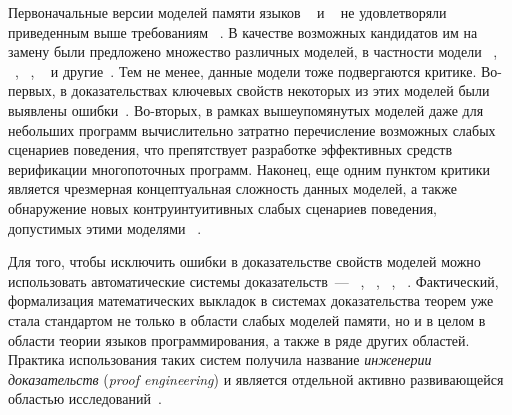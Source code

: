 Первоначальные версии моделей памяти языков
\CPP~\autocite{Batty-al:POPL11} и \Java~\autocite{Manson-al:POPL05}
не удовлетворяли приведенным выше требованиям%
~\autocite{Sevcik-Aspinall:ECOOP08,Vafeiadis-al:POPL15,Batty-al:ESOP15}. 
В качестве возможных кандидатов им на замену были предложено множество различных моделей,
в частности модели \Wkm~\autocite{Chakraborty-Vafeiadis:POPL19}, \Prm~\autocite{Kang-al:POPL17}, 
\MRD~\autocite{Paviotti-al:ESOP20}, \PwT~\autocite{Jagadeesan-al:OOPSLA2020,Jeffrey-al:POPL2022}
и другие~\autocite{Jeffrey-Riely:LICS16, PichonPharabod-Sewell:POPL16, Paviotti-al:ESOP20}.
Тем не менее, данные модели тоже подвергаются критике.
Во-первых, в доказательствах ключевых свойств некоторых из этих моделей 
были выявлены ошибки~\autocite{Jeffrey-Riely:LICS16,PichonPharabod-PhD18,Lahav-al:PLDI17}.
Во-вторых, в рамках вышеупомянутых моделей даже для небольших программ
вычислительно затратно перечисление возможных слабых сценариев поведения,
что препятствует разработке эффективных средств верификации многопоточных программ.
Наконец, еще одним пунктом критики является 
чрезмерная концептуальная сложность данных моделей, 
а также обнаружение новых контруинтуитивных слабых сценариев поведения, 
допустимых этими моделями%
~\autocite{Paviotti-al:ESOP20,Jagadeesan-al:OOPSLA2020,Lee-al:PLDI20,Cho-al:PLDI21}.

Для того, чтобы исключить  ошибки
в доказательстве свойств моделей можно использовать автоматические системы доказательств~--- 
\coq~\autocite{Coq}, \agda~\autocite{Agda}, \lean~\autocite{Lean}, \arend~\autocite{Arend}.
Фактический, формализация математических выкладок
в системах доказательства теорем уже стала стандартом
не только в области слабых моделей памяти,
но и в целом в области теории языков программирования, а также в ряде других областей.
Практика использования таких систем  получила название \emph{инженерии доказательств}
(\emph{proof engineering}) и  является отдельной
активно развивающейся областью исследований~\autocite{Ringer-al:FTPL19}.

